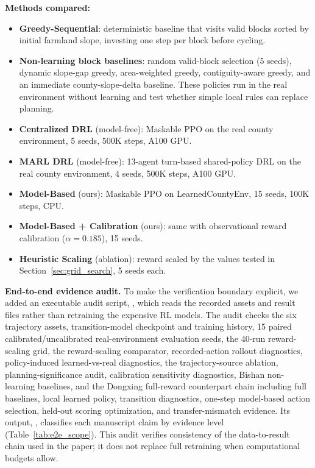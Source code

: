 \documentclass[11pt]{article}
\begin{document}
\textbf{Methods compared:}
\begin{itemize}
\item \textbf{Greedy-Sequential}: deterministic baseline that visits valid blocks sorted by initial farmland slope, investing one step per block before cycling.
\item \textbf{Non-learning block baselines}: random valid-block selection (5 seeds), dynamic slope-gap greedy, area-weighted greedy, contiguity-aware greedy, and an immediate county-slope-delta baseline. These policies run in the real environment without learning and test whether simple local rules can replace planning.
\item \textbf{Centralized DRL} (model-free): Maskable PPO on the real county environment, 5 seeds, 500K steps, A100 GPU.
\item \textbf{MARL DRL} (model-free): 13-agent turn-based shared-policy DRL on the real county environment, 4 seeds, 500K steps, A100 GPU.
\item \textbf{Model-Based} (ours): Maskable PPO on LearnedCountyEnv, 15 seeds, 100K steps, CPU.
\item \textbf{Model-Based + Calibration} (ours): same with observational reward calibration ($\alpha = 0.185$), 15 seeds.
\item \textbf{Heuristic Scaling} (ablation): reward scaled by the values tested in Section~\ref{sec:grid_search}, 5 seeds each.
\end{itemize}

\textbf{End-to-end evidence audit.} To make the verification boundary explicit, we added an executable audit script, , which reads the recorded assets and result files rather than retraining the expensive RL models. The audit checks the six trajectory assets, transition-model checkpoint and training history, 15 paired calibrated/uncalibrated real-environment evaluation seeds, the 40-run reward-scaling grid, the reward-scaling comparator, recorded-action rollout diagnostics, policy-induced learned-vs-real diagnostics, the trajectory-source ablation, planning-significance audit, calibration sensitivity diagnostics, Bishan non-learning baselines, and the Dongxing full-reward counterpart chain including full baselines, local learned policy, transition diagnostics, one-step model-based action selection, held-out scoring optimization, and transfer-mismatch evidence. Its output, , classifies each manuscript claim by evidence level (Table~\ref{tab:e2e_scope}). This audit verifies consistency of the data-to-result chain used in the paper; it does not replace full retraining when computational budgets allow.
\end{document}
